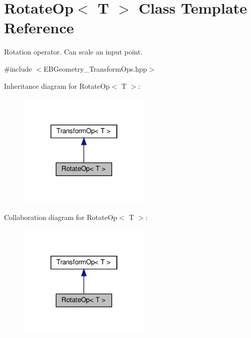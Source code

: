 \hypertarget{classRotateOp}{}\section{Rotate\+Op$<$ T $>$ Class Template Reference}
\label{classRotateOp}


Rotation operator. Can scale an input point.  




{\ttfamily \#include $<$E\+B\+Geometry\+\_\+\+Transform\+Ops.\+hpp$>$}



Inheritance diagram for Rotate\+Op$<$ T $>$\+:\nopagebreak
\begin{figure}[H]
\begin{center}
\leavevmode
\includegraphics[width=178pt]{classRotateOp__inherit__graph}
\end{center}
\end{figure}


Collaboration diagram for Rotate\+Op$<$ T $>$\+:\nopagebreak
\begin{figure}[H]
\begin{center}
\leavevmode
\includegraphics[width=178pt]{classRotateOp__coll__graph}
\end{center}
\end{figure}
